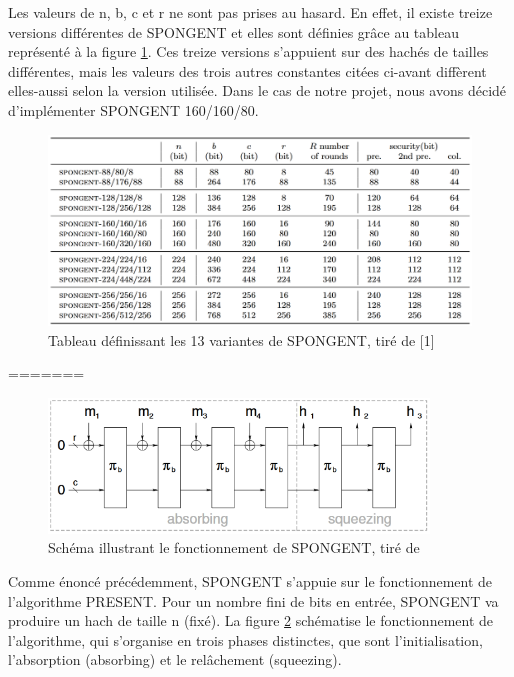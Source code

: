 		Les valeurs de n, b, c et r ne sont pas prises au hasard. En effet, il existe treize versions différentes de SPONGENT et elles sont définies grâce au tableau représenté à la figure \ref{variantesSpongent}.
		Ces treize versions s’appuient sur des hachés de tailles différentes, mais les valeurs des trois autres constantes citées ci-avant diffèrent elles-aussi selon la version utilisée.
		Dans le cas de notre projet, nous avons décidé d’implémenter SPONGENT 160/160/80.
		
		\begin{figure}[h]
			\centering
			\includegraphics[width=\textwidth]{imgs/Spongent/varianteSpongent.png}
			\caption{Tableau définissant  les 13 variantes de SPONGENT, tiré de [1]}
			\label{variantesSpongent}
   		\end{figure}
=======
			\begin{figure}[!h]
				 	\centering
				 	\includegraphics[width=0.9\textwidth]{imgs/Spongent/fctGlobalSpongent.png}
				 	\caption{Schéma illustrant le fonctionnement de SPONGENT, tiré de \cite{6275435}}
				 	\label{fctGlobalSpongent}
			\end{figure}

				Comme énoncé précédemment, SPONGENT s'appuie sur le fonctionnement de
			l'algorithme PRESENT. Pour un nombre fini de bits en entrée, SPONGENT va
			produire un hach de taille n (fixé). La figure \ref{fctGlobalSpongent}
			schématise le fonctionnement de l'algorithme, qui s'organise en trois
			phases distinctes, que sont l'initialisation, l'absorption (absorbing) et
			le relâchement (squeezing).

